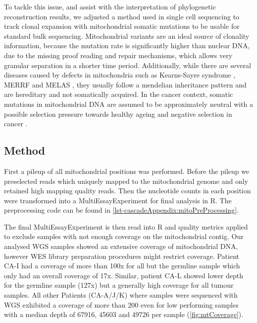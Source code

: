 To tackle this issue, and assist with the interpretation of phylogenetic reconstruction results, we adjusted a method used in single cell sequencing to track clonal expansion with mitochondrial somatic mutations \cite{Ludwig2019} to be usable for standard bulk sequencing. Mitochondrial variants are an ideal source of clonality information, because the mutation rate is significantly higher than nuclear DNA, due to the missing proof reading and repair mechanisms, which allows very granular separation in a shorter time period. Additionally, while there are several diseases caused by defects in mitochondria such as Kearns-Sayre syndrome \cite{Harvey1992}, MERRF \cite{Adam1993} and MELAS \cite{Hirano1992}, they usually follow a mendelian inheritance pattern and are hereditary and not somatically acquired. In the cancer context, somatic mutations in mitochondrial DNA are assumed to be approximately neutral with a possible selection pressure towards healthy ageing and negative selection in cancer \cite{Rodell2013,Yuan2020}.

\subsection{Method}
\label{cascade-sec:mitoMethod}

First a pileup of all mitochondrial positions was performed. Before the pileup we preselected reads which uniquely mapped to the mitochondrial genome and only retained high mapping quality reads. Then the nucleotide counts in each position were transformed into a MultiEssayExperiment \cite{Ramos2017} for final analysis in R. The preprocessing code can be found in \autoref{lst-cascadeAppendix:mitoPreProcessing}.

The final MultiEssayExperiment is then read into R and quality metrics applied to exclude samples with not enough coverage on the mitochondrial contig. Our analysed WGS samples showed an extensive coverage of mitochondrial DNA, however WES library preparation procedures might restrict coverage. Patient CA-I had a coverage of more than 100x for all but the germline sample which only had an overall coverage of 17x. Similar, patient CA-L showed lower depth for the germline sample (127x) but a generally high coverage for all tumour samples. All other Patients (CA-A/J/K) where samples were sequenced with WGS exhibited a coverage of more than 200 even for low performing samples with a median depth of \num{67916}, \num{45603} and \num{49726} per sample (\autoref{fig:mtCoverage}).

